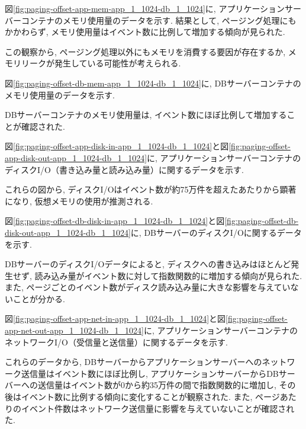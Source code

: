 \documentclass[../../../../main]{subfiles}
\begin{document}
    図\ref{fig:paging-offset-app-mem-app_1_1024-db_1_1024}に, アプリケーションサーバーコンテナのメモリ使用量のデータを示す. 結果として, ページング処理にもかかわらず, メモリ使用量はイベント数に比例して増加する傾向が見られた.

    

    この観察から, ページング処理以外にもメモリを消費する要因が存在するか, メモリリークが発生している可能性が考えられる.

    図\ref{fig:paging-offset-db-mem-app_1_1024-db_1_1024}に, DBサーバーコンテナのメモリ使用量のデータを示す.

    

    DBサーバーコンテナのメモリ使用量は, イベント数にほぼ比例して増加することが確認された.

    \label{subsubsubsec:result-paging-offset-only-limit-disk-io}

    図\ref{fig:paging-offset-app-disk-in-app_1_1024-db_1_1024}と図\ref{fig:paging-offset-app-disk-out-app_1_1024-db_1_1024}に, アプリケーションサーバーコンテナのディスクI/O（書き込み量と読み込み量）に関するデータを示す.

    
    

    これらの図から, ディスクI/Oはイベント数が約75万件を超えたあたりから顕著になり, 仮想メモリの使用が推測される.

    図\ref{fig:paging-offset-db-disk-in-app_1_1024-db_1_1024}と図\ref{fig:paging-offset-db-disk-out-app_1_1024-db_1_1024}に, DBサーバーのディスクI/Oに関するデータを示す.

    
    

    DBサーバーのディスクI/Oデータによると, ディスクへの書き込みはほとんど発生せず, 読み込み量がイベント数に対して指数関数的に増加する傾向が見られた. また, ページごとのイベント数がディスク読み込み量に大きな影響を与えていないことが分かる.

    \label{subsubsubsec:result-paging-offset-only-limit-net-io}

    図\ref{fig:paging-offset-app-net-in-app_1_1024-db_1_1024}と図\ref{fig:paging-offset-app-net-out-app_1_1024-db_1_1024}に, アプリケーションサーバーコンテナのネットワークI/O（受信量と送信量）に関するデータを示す.

    
    

    これらのデータから, DBサーバーからアプリケーションサーバーへのネットワーク送信量はイベント数にほぼ比例し, アプリケーションサーバーからDBサーバーへの送信量はイベント数が0から約35万件の間で指数関数的に増加し, その後はイベント数に比例する傾向に変化することが観察された. また, ページあたりのイベント件数はネットワーク送信量に影響を与えていないことが確認された.
\end{document}
